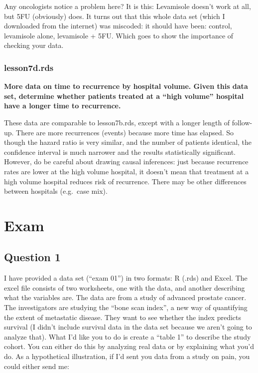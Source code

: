 \documentclass[]{book}
\begin{document}
Any oncologists notice a problem here? It is this: Levamisole doesn't work at all, but 5FU (obviously) does. It turns out that this whole data set (which I downloaded from the internet) was miscoded: it should have been: control, levamisole alone, levamisole + 5FU. Which goes to show the importance of checking your data.

\hypertarget{lesson7d.rds}{%
\subsection{lesson7d.rds}\label{lesson7d.rds}}

\textbf{More data on time to recurrence by hospital volume. Given this data set, determine whether patients treated at a ``high volume'' hospital have a longer time to recurrence.}

These data are comparable to lesson7b.rds, except with a longer length of follow-up. There are more recurrences (events) because more time has elapsed. So though the hazard ratio is very similar, and the number of patients identical, the confidence interval is much narrower and the results statistically significant. However, do be careful about drawing causal inferences: just because recurrence rates are lower at the high volume hospital, it doesn't mean that treatment at a high volume hospital reduces risk of recurrence. There may be other differences between hospitals (e.g.~case mix).

\hypertarget{exam}{%
\chapter{Exam}\label{exam}}

\hypertarget{question-1}{%
\section{Question 1}\label{question-1}}

I have provided a data set (``exam 01'') in two formats: R (.rds) and Excel. The excel file consists of two worksheets, one with the data, and another describing what the variables are. The data are from a study of advanced prostate cancer. The investigators are studying the ``bone scan index'', a new way of quantifying the extent of metastatic disease. They want to see whether the index predicts survival (I didn't include survival data in the data set because we aren't going to analyze that). What I'd like you to do is create a ``table 1'' to describe the study cohort. You can either do this by analyzing real data or by explaining what you'd do. As a hypothetical illustration, if I'd sent you data from a study on pain, you could either send me:
\end{document}
